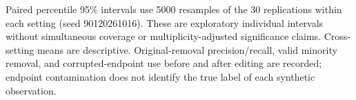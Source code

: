 Paired percentile 95\% intervals use 5000 resamples of the 30 replications within each setting (seed 90120261016). These are exploratory individual intervals without simultaneous coverage or multiplicity-adjusted significance claims. Cross-setting means are descriptive. Original-removal precision/recall, valid minority removal, and corrupted-endpoint use before and after editing are recorded; endpoint contamination does not identify the true label of each synthetic observation.

